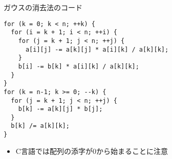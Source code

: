 \begin{frame}[t,fragile]{ガウスの消去法のコード}
\begin{lstlisting}
for (k = 0; k < n; ++k) {
  for (i = k + 1; i < n; ++i) {
    for (j = k + 1; j < n; ++j) {
      a[i][j] -= a[k][j] * a[i][k] / a[k][k];
    }
    b[i] -= b[k] * a[i][k] / a[k][k];
  }
}
for (k = n-1; k >= 0; --k) {
  for (j = k + 1; j < n; ++j) {
    b[k] -= a[k][j] * b[j];
  }
  b[k] /= a[k][k];
}
\end{lstlisting}
\begin{itemize}
\item C言語では配列の添字が0から始まることに注意
\end{itemize}
\end{frame}
